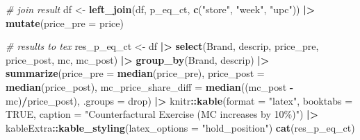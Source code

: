 \documentclass[
]{article}
\newenvironment{Shaded}{\begin{snugshade}}{\end{snugshade}}
\newcommand{\AttributeTok}[1]{\textcolor[rgb]{0.13,0.29,0.53}{#1}}
\newcommand{\CommentTok}[1]{\textcolor[rgb]{0.56,0.35,0.01}{\textit{#1}}}
\newcommand{\ConstantTok}[1]{\textcolor[rgb]{0.56,0.35,0.01}{#1}}
\newcommand{\FunctionTok}[1]{\textcolor[rgb]{0.13,0.29,0.53}{\textbf{#1}}}
\newcommand{\NormalTok}[1]{#1}
\newcommand{\OtherTok}[1]{\textcolor[rgb]{0.56,0.35,0.01}{#1}}
\newcommand{\SpecialCharTok}[1]{\textcolor[rgb]{0.81,0.36,0.00}{\textbf{#1}}}
\newcommand{\StringTok}[1]{\textcolor[rgb]{0.31,0.60,0.02}{#1}}
\begin{document}
\begin{Shaded}
\begin{Highlighting}[]
\CommentTok{\# join result}
\NormalTok{df }\OtherTok{\textless{}{-}} \FunctionTok{left\_join}\NormalTok{(df, p\_eq\_ct, }\FunctionTok{c}\NormalTok{(}\StringTok{"store"}\NormalTok{, }\StringTok{"week"}\NormalTok{, }\StringTok{"upc"}\NormalTok{)) }\SpecialCharTok{|\textgreater{}}
  \FunctionTok{mutate}\NormalTok{(}\AttributeTok{price\_pre =}\NormalTok{ price)}

\CommentTok{\# results to tex}
\NormalTok{res\_p\_eq\_ct }\OtherTok{\textless{}{-}}\NormalTok{ df }\SpecialCharTok{|\textgreater{}}
  \FunctionTok{select}\NormalTok{(Brand, descrip, price\_pre, price\_post, mc, mc\_post) }\SpecialCharTok{|\textgreater{}}
  \FunctionTok{group\_by}\NormalTok{(Brand, descrip) }\SpecialCharTok{|\textgreater{}}
  \FunctionTok{summarize}\NormalTok{(}\AttributeTok{price\_pre =} \FunctionTok{median}\NormalTok{(price\_pre),}
            \AttributeTok{price\_post =} \FunctionTok{median}\NormalTok{(price\_post), }
            \AttributeTok{mc\_price\_share\_diff =} \FunctionTok{median}\NormalTok{((mc\_post }\SpecialCharTok{{-}}\NormalTok{ mc)}\SpecialCharTok{/}\NormalTok{price\_post),}
            \AttributeTok{.groups =} \StringTok{\textquotesingle{}drop\textquotesingle{}}\NormalTok{) }\SpecialCharTok{|\textgreater{}}
\NormalTok{  knitr}\SpecialCharTok{::}\FunctionTok{kable}\NormalTok{(}\AttributeTok{format =} \StringTok{"latex"}\NormalTok{, }\AttributeTok{booktabs =} \ConstantTok{TRUE}\NormalTok{, }
               \AttributeTok{caption =} \StringTok{"Counterfactural Exercise (MC increases by 10\%)"}\NormalTok{) }\SpecialCharTok{|\textgreater{}}
\NormalTok{  kableExtra}\SpecialCharTok{::}\FunctionTok{kable\_styling}\NormalTok{(}\AttributeTok{latex\_options =} \StringTok{"hold\_position"}\NormalTok{)}
\FunctionTok{cat}\NormalTok{(res\_p\_eq\_ct)}
\end{Highlighting}
\end{Shaded}
\end{document}
